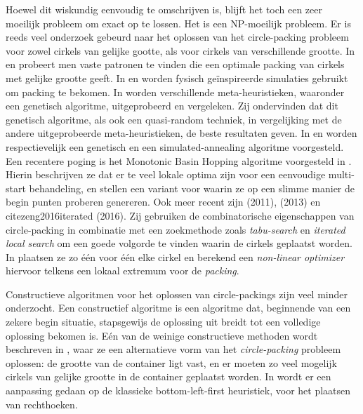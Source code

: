 \documentclass[12pt,a4paper,oneside]{book}
\begin{document}
Hoewel dit wiskundig eenvoudig te omschrijven is, blijft het toch een zeer moeilijk probleem om exact op te lossen.
Het is een NP-moeilijk probleem.
Er is reeds veel onderzoek gebeurd naar het oplossen van het circle-packing probleem voor zowel cirkels van gelijke gootte, als voor cirkels van verschillende grootte.
In \cite{graham1996repeated} en \cite{lubachevsky1997curved} probeert men vaste patronen te vinden die een optimale packing van cirkels met gelijke grootte geeft.
In \cite{graham1998dense} en \cite{wang2002improved} worden fysisch geïnspireerde simulaties gebruikt om packing te bekomen.
In \cite{george1995packing} worden verschillende meta-heuristieken, waaronder een genetisch algoritme, uitgeprobeerd en vergeleken.
Zij ondervinden dat dit genetisch algoritme, als ook een quasi-random techniek, in vergelijking met de andere uitgeprobeerde meta-heuristieken, de beste resultaten geven.
In \cite{hifi2004approximate} en \cite{hifi2004simulated} worden respectievelijk een genetisch en een simulated-annealing algoritme voorgesteld.
Een recentere poging is het Monotonic Basin Hopping algoritme voorgesteld in \cite{grosso2010}.
Hierin beschrijven ze dat er te veel lokale optima zijn voor een eenvoudige multi-start behandeling, en stellen een variant voor waarin ze op een slimme manier de begin punten proberen genereren.
Ook meer recent zijn \cite{jors2011} (2011), \cite{ye2013iterated} (2013) en cite{zeng2016iterated} (2016).
Zij gebruiken de combinatorische eigenschappen van circle-packing in combinatie met een zoekmethode zoals \textit{tabu-search} en \textit{iterated local search} om een goede volgorde te vinden waarin de cirkels geplaatst worden.
In \cite{jors2011} plaatsen ze zo één voor één elke cirkel en berekend een \textit{non-linear optimizer} hiervoor telkens een lokaal extremum voor de \textit{packing}.

Constructieve algoritmen voor het oplossen van circle-packings zijn veel minder onderzocht.
Een constructief algoritme is een algoritme dat, beginnende van een zekere begin situatie, stapsgewijs de oplossing uit breidt tot een volledige oplossing bekomen is.
Eén van de weinige constructieve methoden wordt beschreven in \cite{akeb2006basic}, waar ze een alternatieve vorm van het \textit{circle-packing} probleem oplossen: de grootte van de container ligt vast, en er moeten zo veel mogelijk cirkels van gelijke grootte in de container geplaatst worden.
In \cite{hifi2004approximate} wordt er een aanpassing gedaan op de klassieke bottom-left-first heuristiek, voor het plaatsen van rechthoeken.
\end{document}
